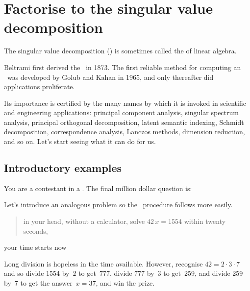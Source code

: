 

\section{Factorise to the singular value decomposition}
\label{sec:fisvd}
\secttoc

\begin{comment}
\pooliv{\S7.4} \holti{\S8.4} \cite[\S06]{Davis99a} \cite[\S8.7]{Nakos1998}
In a sense, the \svd\ replaces the \(\tr PLU\) factorisation of classic linear algebra, e.g.\ \pooliv{\S3.4}.
The computation of an \svd\ is well conditioned, unlike \textsc{lu} decomposition and eigenvalue calculations which are commonly poorly conditioned.
\end{comment}


The singular value decomposition (\svd) is sometimes called the  of  linear algebra.
\begin{aside}
Beltrami first derived the \svd\ in 1873.  
The first reliable method for computing an \svd\ was developed by Golub and Kahan in 1965, and only thereafter did applications proliferate.
\end{aside}
Its importance is certified by the many names by which it is invoked in scientific and engineering applications: principal component analysis, singular spectrum analysis, principal orthogonal decomposition, latent semantic indexing, Schmidt decomposition, correspondence analysis, Lanczos methods, dimension reduction, and so on.
Let's start seeing what it can do for us.




\subsection{Introductory examples}
\label{sec:svdeg}

You are a contestant in a .
The final million dollar question is: 
\begin{aside}
Let's introduce an analogous problem so the \svd\ procedure follows more easily.
\end{aside}
\begin{quote}
in your head, without a calculator, solve \(42\,x=1554\) within twenty seconds,
\end{quote} 
your time starts now \dotfill
\begin{solution} 
Long division is hopeless in the time available.  
However, recognise \(42=2\cdot3\cdot7\) and so divide 1554 by~2 to get~777, divide 777 by~3 to get~259, and divide 259 by~7 to get the answer~\(x=37\), and win the prize.
\end{solution}

